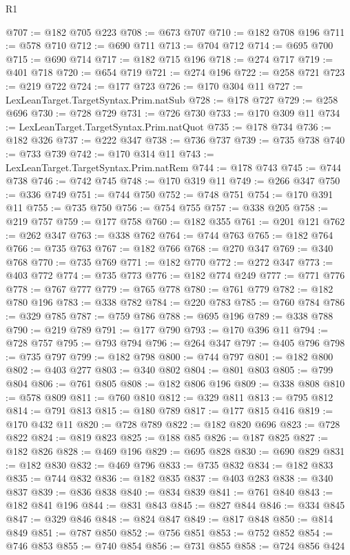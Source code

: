 \begin{lexlean}{R1}
\begin{coremodule}
@707 := @182 @705 @223
@708 := @673 @707
@710 := @182 @708 @196
@711 := @578 @710
@712 := @690 @711
@713 := @704 @712
@714 := @695 @700
@715 := @690 @714
@717 := @182 @715 @196
@718 := @274 @717
@719 := @401 @718
@720 := @654 @719
@721 := @274 @196
@722 := @258 @721
@723 := @219 @722
@724 := @177 @723
@726 := @170 @304 @11
@727 := LexLeanTarget.TargetSyntax.Prim.natSub
@728 := @178 @727
@729 := @258 @696
@730 := @728 @729
@731 := @726 @730
@733 := @170 @309 @11
@734 := LexLeanTarget.TargetSyntax.Prim.natQuot
@735 := @178 @734
@736 := @182 @326
@737 := @222 @347
@738 := @736 @737
@739 := @735 @738
@740 := @733 @739
@742 := @170 @314 @11
@743 := LexLeanTarget.TargetSyntax.Prim.natRem
@744 := @178 @743
@745 := @744 @738
@746 := @742 @745
@748 := @170 @319 @11
@749 := @266 @347
@750 := @336 @749
@751 := @744 @750
@752 := @748 @751
@754 := @170 @391 @11
@755 := @735 @750
@756 := @754 @755
@757 := @338 @205
@758 := @219 @757
@759 := @177 @758
@760 := @182 @355
@761 := @201 @121
@762 := @262 @347
@763 := @338 @762
@764 := @744 @763
@765 := @182 @764
@766 := @735 @763
@767 := @182 @766
@768 := @270 @347
@769 := @340 @768
@770 := @735 @769
@771 := @182 @770
@772 := @272 @347
@773 := @403 @772
@774 := @735 @773
@776 := @182 @774 @249
@777 := @771 @776
@778 := @767 @777
@779 := @765 @778
@780 := @761 @779
@782 := @182 @780 @196
@783 := @338 @782
@784 := @220 @783
@785 := @760 @784
@786 := @329 @785
@787 := @759 @786
@788 := @695 @196
@789 := @338 @788
@790 := @219 @789
@791 := @177 @790
@793 := @170 @396 @11
@794 := @728 @757
@795 := @793 @794
@796 := @264 @347
@797 := @405 @796
@798 := @735 @797
@799 := @182 @798
@800 := @744 @797
@801 := @182 @800
@802 := @403 @277
@803 := @340 @802
@804 := @801 @803
@805 := @799 @804
@806 := @761 @805
@808 := @182 @806 @196
@809 := @338 @808
@810 := @578 @809
@811 := @760 @810
@812 := @329 @811
@813 := @795 @812
@814 := @791 @813
@815 := @180 @789
@817 := @177 @815 @416
@819 := @170 @432 @11
@820 := @728 @789
@822 := @182 @820 @696
@823 := @728 @822
@824 := @819 @823
@825 := @188 @85
@826 := @187 @825
@827 := @182 @826
@828 := @469 @196
@829 := @695 @828
@830 := @690 @829
@831 := @182 @830
@832 := @469 @796
@833 := @735 @832
@834 := @182 @833
@835 := @744 @832
@836 := @182 @835
@837 := @403 @283
@838 := @340 @837
@839 := @836 @838
@840 := @834 @839
@841 := @761 @840
@843 := @182 @841 @196
@844 := @831 @843
@845 := @827 @844
@846 := @334 @845
@847 := @329 @846
@848 := @824 @847
@849 := @817 @848
@850 := @814 @849
@851 := @787 @850
@852 := @756 @851
@853 := @752 @852
@854 := @746 @853
@855 := @740 @854
@856 := @731 @855
@858 := @724 @856 @424

\end{coremodule}
\end{lexlean}
